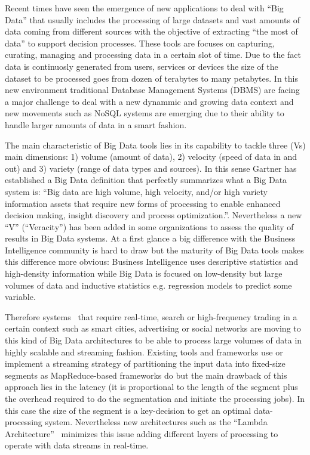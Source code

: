 Recent times have seen the emergence of new applications to deal with ``Big Data'' that usually 
includes the processing of large datasets and vast amounts of data coming from different sources 
with the objective of extracting ``the most of data'' to support decision processes. These tools 
are focuses on capturing, curating, managing and processing data in a certain slot of time. Due 
to the fact data is continuosly generated from users, services or devices the size of the dataset 
to be processed goes from dozen of terabytes to many petabytes. In this new environment 
traditional Database Management Systems (DBMS) are facing a major challenge to deal with 
a new dynammic and growing data context and new movements such as NoSQL systems are emerging due to 
their ability to handle larger amounts of data in a smart fashion.

The main characteristic of Big Data tools lies in its capability to tackle three (Vs) main dimensions: 
1) volume (amount of data), 2) velocity (speed of data in and out) and 3) variety (range of 
data types and sources). In this sense Gartner has established a Big Data definition 
that perfectly summarizes what a Big Data system is: ``Big data are high volume,
high velocity, and/or high variety information assets that require new forms of
processing to enable enhanced decision making, insight discovery and process
optimization.''. Nevertheless a new ``V'' (``Veracity'') has been added in 
some organizations to assess the quality of results in Big Data systems. At a first glance 
a big difference with the Business Intelligence community is hard to draw but the maturity 
of Big Data tools makes this difference more obvious: Business Intelligence uses 
descriptive statistics and high-density information while Big Data is focused on low-density but large volumes of data and 
inductive statistics e.g. regression models to predict some variable.

Therefore systems~\cite{BigDataComputing} that require real-time, search or high-frequency trading 
in a certain context such as smart cities, advertising or social networks are moving 
to this kind of Big Data architectures to be able to process large 
volumes of data in highly scalable and streaming fashion. Existing tools 
and frameworks use or implement a streaming strategy of partitioning 
the input data into fixed-size segments as MapReduce-based frameworks do but
the main drawback of this approach lies in the latency (it is proportional to
the length of the segment plus the overhead required to do the segmentation and initiate
the processing jobs). In this case the size of the segment is a key-decision 
to get an optimal data-processing system. Nevertheless new architectures such 
as the ``Lambda Architecture''~\cite{BigDataManing} minimizes this issue adding different layers 
of processing to operate with data streams in real-time.

